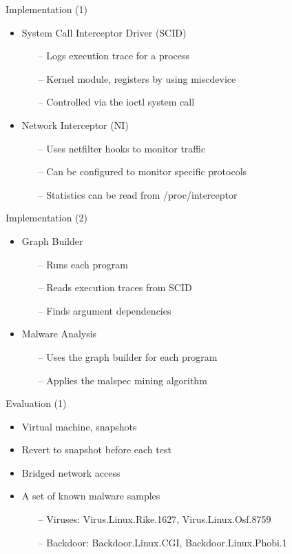 \documentclass{beamer}
\begin{document}
\begin{frame}{Implementation (1)}
  \begin{itemize}
    \item System Call Interceptor Driver (SCID)
    \begin{itemize}
      \item[--] Logs execution trace for a process
      \item[--] Kernel module, registers by using miscdevice
      \item[--] Controlled via the ioctl system call
    \end{itemize}
    \item Network Interceptor (NI)
    \begin{itemize}
      \item[--] Uses netfilter hooks to monitor traffic
      \item[--] Can be configured to monitor specific protocols
      \item[--] Statistics can be read from /proc/interceptor
    \end{itemize}
  \end{itemize}
\end{frame}

\begin{frame}{Implementation (2)}
  \begin{itemize}
    \item Graph Builder
    \begin{itemize}
      \item[--] Runs each program
      \item[--] Reads execution traces from SCID
      \item[--] Finds argument dependencies
    \end{itemize}
    \item Malware Analysis
    \begin{itemize}
      \item[--] Uses the graph builder for each program
      \item[--] Applies the malspec mining algorithm
    \end{itemize}
  \end{itemize}
\end{frame}

\begin{frame}{Evaluation (1)}
  \begin{itemize}
    \item Virtual machine, snapshots
    \item Revert to snapshot before each test
    \item Bridged network access
    \item A set of known malware samples
    \begin{itemize}
      \item[--] Viruses: Virus.Linux.Rike.1627, Virus.Linux.Osf.8759
      \item[--] Backdoor: Backdoor.Linux.CGI, Backdoor.Linux.Phobi.1
    \end{itemize}
  \end{itemize}
\end{frame}
\end{document}
